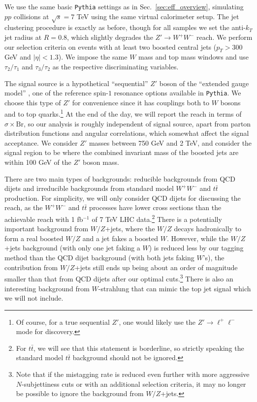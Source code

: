\documentclass{JHEP3}
\DeclareRobustCommand{\Sec}[1]{Sec.~\ref{#1}}
\begin{document}
We use the same basic \texttt{Pythia} settings as in \Sec{sec:eff_overview}, simulating $pp$ collisions at $\sqrt{s} = 7$ TeV using the same virtual calorimeter setup.  The jet clustering procedure is exactly as before, though for all samples we set the anti-$k_T$ jet radius at $R=0.8$, which slightly degrades the $Z' \rightarrow W^+ W^-$ reach.  We perform our selection criteria on events with at least two boosted central jets ($p_T > 300$ GeV and $|\eta|<1.3$).  We impose the same $W$ mass and top mass windows and use $\tau_2/\tau_1$ and $\tau_3/\tau_2$ as the respective discriminating variables. 

The signal source is a hypothetical ``sequential'' $Z'$ boson of the ``extended gauge model'' \cite{Altarelli:1989ff}, one of the reference spin-$1$ resonance options available in \texttt{Pythia}.  We choose this type of $Z'$ for convenience since it has couplings both to $W$ bosons and to top quarks.\footnote{Of course, for a true sequential $Z'$, one would likely use the $Z' \rightarrow \ell^+ \ell^-$ mode for discovery.}  At the end of the day, we will report the reach in terms of $\sigma \times \text{Br}$, so our analysis is roughly independent of signal source, apart from parton distribution functions and angular correlations, which somewhat affect the signal acceptance. We consider $Z'$ masses between 750 GeV and 2 TeV, and consider the signal region to be where the combined invariant mass of the boosted jets are within 100 GeV of the $Z'$ boson mass.   

There are two main types of backgrounds:  reducible backgrounds from QCD dijets and irreducible backgrounds from standard model $W^+W^-$ and $t\bar{t}$ production.  For simplicity, we will only consider QCD dijets for discussing the reach, as the $W^+W^-$ and $t\bar{t}$ processes have lower cross sections than the achievable reach with 1 fb$^{-1}$ of 7 TeV LHC data.\footnote{For $t\bar{t}$, we will see that this statement is borderline, so strictly speaking the standard model $t\bar{t}$ background should not be ignored.}    There is a potentially important background from $W/Z$+jets, where the $W/Z$ decays hadronically to form a real boosted $W/Z$ and a jet fakes a boosted $W$.  However, while the $W/Z$+jets background (with only one jet faking a $W$) is reduced less by our tagging method than the QCD dijet background (with both jets faking $W$'s), the contribution from $W/Z$+jets still ends up being about an order of magnitude smaller than that from QCD dijets after our optimal cuts.\footnote{Note that if the mistagging rate is reduced even further with more aggressive $N$-subjettiness cuts or with an additional selection criteria, it may no longer be possible to ignore the background from $W/Z$+jets.}  There is also an interesting background from $W$-strahlung that can mimic the top jet signal \cite{Rehermann:2010vq} which we will not include.
\end{document}

